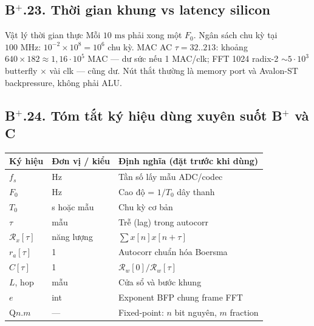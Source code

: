\subsection*{B$^+$.23. Thời gian khung vs latency silicon}

\begin{firstprin}{Vật lý thời gian thực}
Mỗi $10\text{ ms}$ phải xong một $F_0$. Ngân sách chu kỳ tại $100\text{ MHz}$: $10^{-2}\times10^{8}=10^{6}$ chu kỳ. MAC AC $\tau=32..213$: khoảng $640\times182\approx1{,}16\cdot10^{5}$ MAC --- dư sức nếu 1 MAC/clk; FFT 1024 radix-2 $\sim5\cdot10^{3}$ butterfly $\times$ vài clk --- cũng dư. Nút thắt thường là memory port và Avalon-ST backpressure, không phải ALU.
\end{firstprin}

\subsection*{B$^+$.24. Tóm tắt ký hiệu dùng xuyên suốt B$^+$ và C}

\begin{center}\small
\begin{tabular}{@{}llp{6cm}@{}}
\toprule
Ký hiệu & Đơn vị / kiểu & Định nghĩa (đặt trước khi dùng) \\
\midrule
$f_s$ & Hz & Tần số lấy mẫu ADC/codec \\
$F_0$ & Hz & Cao độ = $1/T_0$ dây thanh \\
$T_0$ & s hoặc mẫu & Chu kỳ cơ bản \\
$\tau$ & mẫu & Trễ (lag) trong autocorr \\
$\mathcal{R}_x[\tau]$ & năng lượng & $\sum x[n]x[n+\tau]$ \\
$r_a[\tau]$ & 1 & Autocorr chuẩn hóa Boersma \\
$C[\tau]$ & 1 & $\mathcal{R}_w[0]/\mathcal{R}_w[\tau]$ \\
$L$, hop & mẫu & Cửa sổ và bước khung \\
$e$ & int & Exponent BFP chung frame FFT \\
Q$n.m$ & --- & Fixed-point: $n$ bit nguyên, $m$ fraction \\
\bottomrule
\end{tabular}
\end{center}

\newpage
